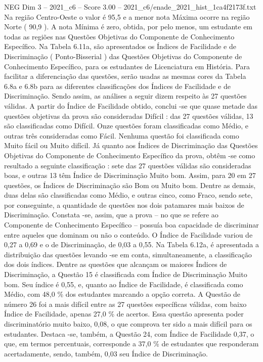 \begin{textsample}{NEG Dim 3 – 2021\_c6 – Score 3.00 – 2021\_c6/enade\_2021\_hist\_1ca4f2173f.txt}
Na região Centro-Oeste o valor é 95,5 e a menor nota Máxima ocorre na região Norte ( 90,9 ).
A nota Mínima é zero, obtida, por pelo menos, um estudante em todas as regiões nas Questões Objetivas do Componente de Conhecimento Específico.
Na Tabela 6.11a, são apresentados os Índices de Facilidade e de Discriminação ( Ponto-Bisserial ) das Questões Objetivas do Componente de Conhecimento Específico, para os estudantes de Licenciatura em História.
Para facilitar a diferenciação das questões, serão usadas as mesmas cores da Tabela 6.8a e 6.8b para as diferentes classificações dos Índices de Facilidade e de Discriminação.
Sendo assim, as análises a seguir dizem respeito às 27 questões válidas.
A partir do Índice de Facilidade obtido, conclui -se que quase metade das questões objetivas da prova são consideradas Difícil : das 27 questões válidas, 13 são classificadas como Difícil.
Onze questões foram classificadas como Médio, e outras três consideradas como Fácil.
Nenhuma questão foi classificada como Muito fácil ou Muito difícil.
Já quanto aos Índices de Discriminação das Questões Objetivas do Componente de Conhecimento Específico da prova, obtêm -se como resultado a seguinte classificação : sete das 27 questões válidas são consideradas boas, e outras 13 têm Índice de Discriminação Muito bom.
Assim, para 20 em 27 questões, os Índices de Discriminação são Bom ou Muito bom.
Dentre as demais, duas delas são classificadas como Médio, e outras cinco, como Fraco, sendo sete, por conseguinte, a quantidade de questões nos dois patamares mais baixos de Discriminação.
Constata -se, assim, que a prova – no que se refere ao Componente de Conhecimento Específico – possuía boa capacidade de discriminar entre aqueles que dominam ou não o conteúdo.
O Índice de Facilidade variou de 0,27 a 0,69 e o de Discriminação, de 0,03 a 0,55.
Na Tabela 6.12a, é apresentada a distribuição das questões levando -se em conta, simultaneamente, a classificação dos dois índices.
Dentre as questões que alcançam os maiores Índices de Discriminação, a Questão 15 é classificada com Índice de Discriminação Muito bom.
Seu índice é 0,55, e, quanto ao Índice de Facilidade, é classificada como Médio, com 48,0 \% dos estudantes marcando a opção correta.
A Questão de número 26 foi a mais difícil entre as 27 questões específicas válidas, com baixo Índice de Facilidade, apenas 27,0 \% de acertos.
Essa questão apresenta poder discriminatório muito baixo, 0,08, o que comprova ter sido a mais difícil para os estudantes.
Destaca -se, também, a Questão 24, com Índice de Facilidade 0,37, o que, em termos percentuais, corresponde a 37,0 \% de estudantes que responderam acertadamente, sendo, também, 0,03 seu Índice de Discriminação.

\end{textsample}
